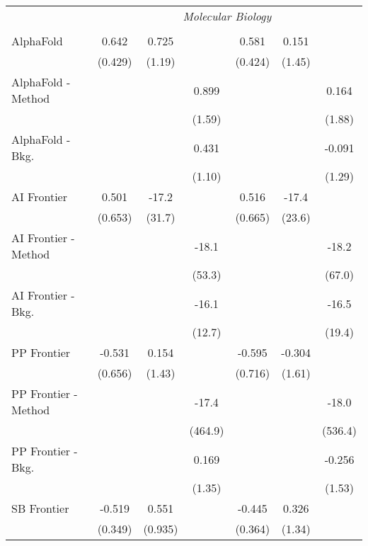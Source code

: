 \begin{tabular}{lcccccc}
 & \multicolumn{6}{c}{\textit{Molecular Biology}} \\ \\
   AlphaFold            & 0.642   & 0.725   &         & 0.581   & 0.151  &   \\   
                        & (0.429) & (1.19)  &         & (0.424) & (1.45) &   \\   
   AlphaFold - Method   &         &         & 0.899   &         &        & 0.164\\   
                        &         &         & (1.59)  &         &        & (1.88)\\   
   AlphaFold - Bkg.     &         &         & 0.431   &         &        & -0.091\\   
                        &         &         & (1.10)  &         &        & (1.29)\\   
   AI Frontier          & 0.501   & -17.2   &         & 0.516   & -17.4  &   \\   
                        & (0.653) & (31.7)  &         & (0.665) & (23.6) &   \\   
   AI Frontier - Method &         &         & -18.1   &         &        & -18.2\\   
                        &         &         & (53.3)  &         &        & (67.0)\\   
   AI Frontier - Bkg.   &         &         & -16.1   &         &        & -16.5\\   
                        &         &         & (12.7)  &         &        & (19.4)\\   
   PP Frontier          & -0.531  & 0.154   &         & -0.595  & -0.304 &   \\   
                        & (0.656) & (1.43)  &         & (0.716) & (1.61) &   \\   
   PP Frontier - Method &         &         & -17.4   &         &        & -18.0\\   
                        &         &         & (464.9) &         &        & (536.4)\\   
   PP Frontier - Bkg.   &         &         & 0.169   &         &        & -0.256\\   
                        &         &         & (1.35)  &         &        & (1.53)\\   
   SB Frontier          & -0.519  & 0.551   &         & -0.445  & 0.326  &   \\   
                        & (0.349) & (0.935) &         & (0.364) & (1.34) &   \\   

\end{tabular}

